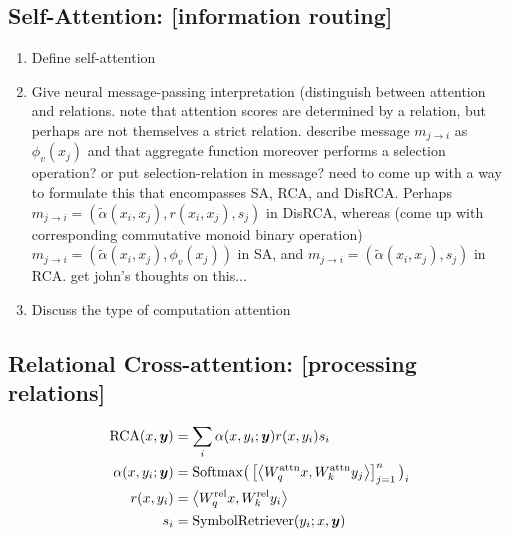 \subsection{Self-Attention: [information routing]}
\begin{enumerate}
  \item Define self-attention
  \item Give neural message-passing interpretation (distinguish between attention and relations. note that attention scores are determined by a relation, but perhaps are not themselves a strict relation. describe message $m_{j \to i}$ as $\phi_v(x_j)$ and that aggregate function moreover performs a selection operation? or put selection-relation in message? need to come up with a way to formulate this that encompasses SA, RCA, and  DisRCA. Perhaps $m_{j \to i} = (\tilde{\alpha}(x_i, x_j), r(x_i, x_j), s_j)$ in DisRCA, whereas (come up with corresponding commutative monoid binary operation) $m_{j \to i} =  (\tilde{\alpha}(x_i, x_j), \phi_v(x_j))$ in SA, and $m_{j \to i} =  (\tilde{\alpha}(x_i, x_j), s_j)$ in RCA. get john's thoughts on this...
  \item Discuss the type of computation attention
\end{enumerate}

\subsection{Relational Cross-attention: [processing relations]}


\begin{align}
    \RCA(x, \y) &= \sum_{i} \alpha(x, y_i; \y) r(x, y_i) s_i \\
    \alpha(x, y_i; \y) &= \Softmax\bigparen{\bra{\iprod{W_q^{\attn} x}{W_k^{\attn} y_j}}_{j=1}^{n}}_i \\
    r(x, y_i) &= \iprod{W_q^{\rel} x}{W_k^{\rel} y_i}\\
    s_i &= \mathrm{SymbolRetriever}(y_i; x, \y) %
\end{align}

